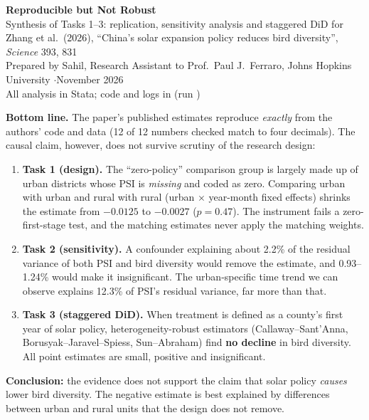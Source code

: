 \documentclass[11pt]{article}
\begin{document}
\begin{center}
{\LARGE\bfseries Reproducible but Not Robust}\\[6pt]
{\large Synthesis of Tasks 1--3: replication, sensitivity analysis and staggered DiD for}\\[2pt]
{\large Zhang et al.\ (2026), ``China's solar expansion policy reduces bird diversity'', \textit{Science} 393, 831}\\[8pt]
{\small Prepared by Sahil, Research Assistant to Prof.\ Paul J.\ Ferraro, Johns Hopkins University \quad$\cdot$\quad November 2026}\\[2pt]
{\small All analysis in Stata; code and logs in  (run )}
\end{center}

\begin{summarybox}
\small
\textbf{Bottom line.} The paper's published estimates reproduce \emph{exactly} from the authors' code and data (12 of 12 numbers checked match to four decimals). The causal claim, however, does not survive scrutiny of the research design:
\begin{enumerate}[leftmargin=14pt]
\item \textbf{Task 1 (design).} The ``zero-policy'' comparison group is largely made up of urban districts whose PSI is \emph{missing} and coded as zero. Comparing urban with urban and rural with rural (urban $\times$ year-month fixed effects) shrinks the estimate from $-0.0125$ to $-0.0027$ ($p=0.47$). The instrument fails a zero-first-stage test, and the matching estimates never apply the matching weights.
\item \textbf{Task 2 (sensitivity).} A confounder explaining about 2.2\% of the residual variance of both PSI and bird diversity would remove the estimate, and 0.93--1.24\% would make it insignificant. The urban-specific time trend we can observe explains 12.3\% of PSI's residual variance, far more than that.
\item \textbf{Task 3 (staggered DiD).} When treatment is defined as a county's first year of solar policy, heterogeneity-robust estimators (Callaway--Sant'Anna, Borusyak--Jaravel--Spiess, Sun--Abraham) find \textbf{no decline} in bird diversity. All point estimates are small, positive and insignificant.
\end{enumerate}
\textbf{Conclusion:} the evidence does not support the claim that solar policy \emph{causes} lower bird diversity. The negative estimate is best explained by differences between urban and rural units that the design does not remove.
\end{summarybox}
\end{document}
